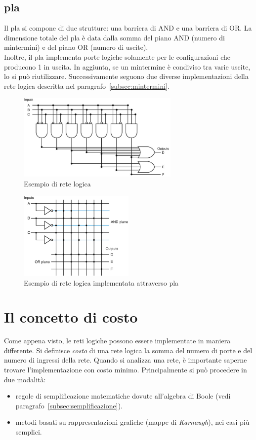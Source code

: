 \documentclass[class=book, crop=false, oneside]{standalone}
\begin{document}
\subsection*{\acrfull{pla}}
\label{subsec:pla}
Il \acrfull{pla} si compone di due strutture: una barriera di AND e una barriera di OR. La dimensione totale del \acrshort{pla} è data dalla somma del piano AND (numero di mintermini) e del piano OR (numero di uscite).\\
Inoltre, il \acrshort{pla} implementa porte logiche solamente per le configurazioni che producono 1 in uscita. In aggiunta, se un mintermine è condiviso tra varie uscite, lo si può riutilizzare.
Successivamente seguono due diverse implementazioni della rete logica descritta nel paragrafo~\ref{subsec:mintermini}.
\begin{figure}[H]
	\centering
	\includegraphics[width=0.7\textwidth,keepaspectratio]{es_rete_logica.png}
	\caption{Esempio di rete logica}
\end{figure}
\begin{figure}[H]
	\centering
	\includegraphics[width=0.5\textwidth,keepaspectratio]{es_pla.png}
	\caption{Esempio di rete logica implementata attraverso \acrshort{pla}}
\end{figure}

\section{Il concetto di costo}
Come appena visto, le reti logiche possono essere implementate in maniera differente. Si definisce \emph{costo} di una rete logica la somma del numero di porte e del numero di ingressi della rete. Quando si analizza una rete, è importante saperne trovare l'implementazione con costo minimo. Principalmente si può procedere in due modalità:
\begin{itemize}[noitemsep]
	\item regole di semplificazione matematiche dovute all'algebra di Boole (vedi paragrafo~\ref{subsec:semplificazione}).
	\item metodi basati su rappresentazioni grafiche (mappe di \emph{Karnaugh}), nei casi più semplici.
\end{itemize}
\end{document}
